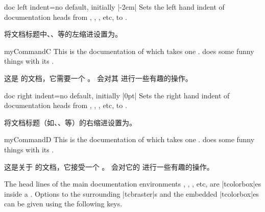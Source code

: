 \begin{docTcbKey}{doc left indent}{=}{no default, initially |-2em|}
Sets the left hand indent of documentation heads from
, , , etc, to .

将文档标题中、、等的左缩进设置为。
\begin{dispExample}
\begin{docCommand*}[doc left indent=2cm]{myCommandC}{}
This is the documentation of  which takes one .
 does some funny things with its .

这是  的文档，它需要一个 。  会对其  进行一些有趣的操作。
\end{docCommand*}
\end{dispExample}
\end{docTcbKey}


\begin{docTcbKey}{doc right indent}{=}{no default, initially |0pt|}
Sets the right hand indent of documentation heads from
, , , etc, to .

将文档标题（如、、等）的右缩进设置为。
\begin{dispExample}
\begin{docCommand*}[doc right indent=-10mm,doc right=10mm,
doc description=test value]{myCommandD}{}
This is the documentation of  which takes one .
 does some funny things with its .

这是关于  的文档，它接受一个 。  会对它的  进行一些有趣的操作。
\end{docCommand*}
\end{dispExample}
\end{docTcbKey}

The head lines of the main documentation environments ,
, , etc, are |tcolorbox|es inside a
.
Options to the surrounding |tcbraster|s and the embedded
|tcolorbox|es can be given using the following keys.

